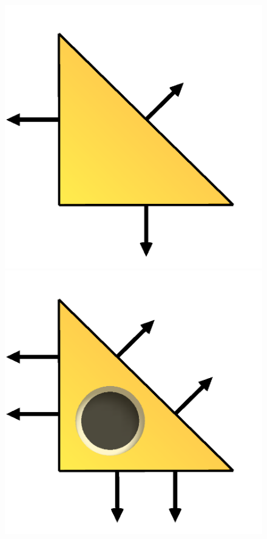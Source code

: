 \begin{figure}
  \begin{center}
    \includegraphics[width=\elmfigsizetriple]{chapters/kirby-6/png/RT1_2d.png}
    \includegraphics[width=\elmfigsizetriple]{chapters/kirby-6/png/RT2_2d.png}

\end{center}
\end{figure}
